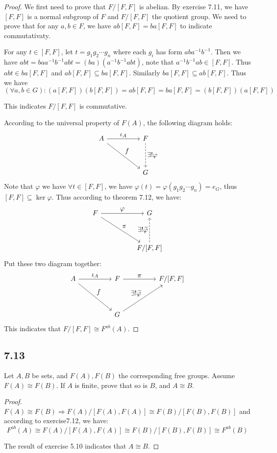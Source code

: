 \documentclass[a4paper, pdf, 12pt]{article}
\begin{document}
\begin{proof}
  We first need to prove that $F/[F, F]$ is abelian. By exercise 7.11, we have 
  $[F,F]$ is a normal subgroup of $F$ and $F/[F, F]$ the quotient group. 
  We need to prove that for any $a,b\in F$, we have $ab[F, F] = ba[F, F]$ to indicate commutativaty.

  For any $t\in [F, F]$, let $t = g_1g_2\cdots g_{n}$ where each $g_{i}$ has form $aba^{-1}b^{-1}$. 
  Then we have $abt = baa^{-1}b^{-1}abt = (ba)(a^{-1}b^{-1}abt)$, note that $a^{-1}b^{-1}ab\in [F,F]$. 
  Thus $abt\in ba[F, F]$ and $ab[F, F]\subseteq ba[F, F]$. Similarly $ba[F, F]\subseteq ab[F, F]$. Thus we 
  have $$
  (\forall a,b\in G): (a[F,F])(b[F,F]) = ab[F,F] = ba[F,F] = (b[F,F])(a[F,F])
  $$

  \noindent
  This indicates $F/[F, F]$ is commutative.

  According to the universal property of $F(A)$, the following diagram holds:
  $$
  \begin{tikzcd}[column sep = huge, row sep = huge,
    every label/.append style={font=\normalsize}]
    A \ar[rd, "f"] \ar[r, "\iota_{A}"]& F\ar[d, dashed, "\exists !\varphi"] \\
      & G
  \end{tikzcd}
  $$
  Note that $\varphi$ we have $\forall t\in [F, F]$, we have 
  $\varphi(t) = \varphi(g_1g_2\cdots g_{n}) = e_{G}$, thus $[F, F]\subseteq \ker \varphi$.
  Thus according to theorem 7.12, we have:
  $$
  \begin{tikzcd}[column sep = huge, row sep = huge, every label/.append
style={font=\normalsize}]
    F \ar[r, "\varphi"] \ar[rd, "\pi"] & G\\
      & F/[F, F] \ar[u, dashed, "\exists!\widetilde{\varphi}"]
  \end{tikzcd}
  $$
  Put these two diagram together:
  $$
  \begin{tikzcd}[column sep = huge, row sep = huge, every label/.append
style={font=\normalsize}]
    A \ar[rd, "f"]\ar[r, "\iota_{A}"] & F \ar[r, "\pi"]& F/[F, F]\\
      & G \ar[ur, "\exists!\widetilde{\varphi}"] &
  \end{tikzcd}
  $$
  This indicates that $F/[F, F]\cong F^{ab}(A)$.
\end{proof}

\subsection*{7.13}
Let $A, B$ be sets, and $F(A), F(B)$ the corresponding free groups. Assume
$F(A) \cong F(B)$. If $A$ is finite, prove that so is $B$, and $A \cong B$.
\begin{proof}
  $F(A)\cong F(B)\Rightarrow F(A)/[F(A), F(A)]\cong F(B)/[F(B), F(B)]$ and according to 
  exercise7.12, we have: 
  $$F^{ab}(A)\cong F(A)/[F(A), F(A)]\cong F(B)/[F(B), F(B)]\cong F^{ab}(B)$$

  \noindent
  The result of exercise 5.10 indicates that $A\cong B$.
\end{proof}
\end{document}
